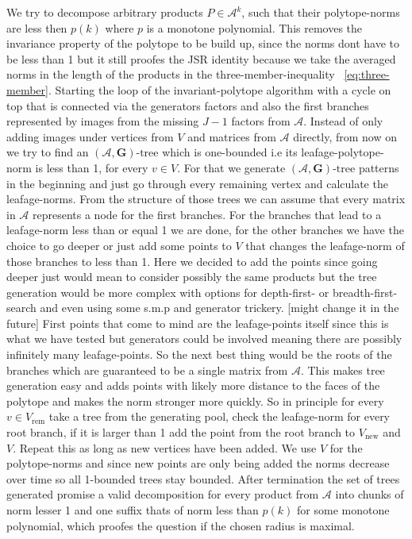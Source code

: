 We try to decompose arbitrary products $P \in \mathcal{A}^k$, such that their polytope-norms are less then $p(k)$ where $p$ is a monotone polynomial.
This removes the invariance property of the polytope to be build up, since the norms dont have to be less than 1 but it still proofes the JSR identity because we take the averaged norms in the length of the products in the three-member-inequality ~\ref{eq:three-member}.
\newline 
Starting the loop of the invariant-polytope algorithm with a cycle on top that is connected via the generators factors and also the first branches represented by images from the missing $J-1$ factors from $\mathcal{A}$. Instead of only adding images under vertices from $V$ and matrices from $\mathcal{A}$ directly, from now on we try to find an $(\mathcal{A},\mathbf{G})\text{-tree}$ which is one-bounded i.e its leafage-polytope-norm is less than 1, for every $v \in V$.
For that we generate $(\mathcal{A},\mathbf{G})\text{-tree}$ patterns in the beginning and just go through every remaining vertex and calculate the leafage-norms. From the structure of those trees we can assume that every matrix in $\mathcal{A}$ represents a node for the first branches.
For the branches that lead to a leafage-norm less than or equal 1 we are done, for the other branches we have the choice to go deeper or just add some points to $V$ that changes the leafage-norm of those branches to less than 1. Here we decided to add the points since going deeper just would mean to consider possibly the same products but the tree generation would be more complex with options for depth-first- or breadth-first-search and even using some s.m.p and generator trickery. [might change it in the future]
\newline
First points that come to mind are the leafage-points itself since this is what we have tested but generators could be involved meaning there are possibly infinitely many leafage-points. So the next best thing would be the roots of the branches which are guaranteed to be a single matrix from $\mathcal{A}$. This makes tree generation easy and adds points with likely more distance to the faces of the polytope and makes the norm stronger more quickly.
\newline
So in principle for every $v \in V_{\text{rem}}$ take a tree from the generating pool, check the leafage-norm for every root branch, if it is larger than 1 add the point from the root branch to $V_{\text{new}}$ and $V$. Repeat this as long as new vertices have been added. We use $V$ for the polytope-norms and since new points are only being added the norms decrease over time so all 1-bounded trees stay bounded.
\newline
After termination the set of trees generated promise a valid decomposition for every product from $\mathcal{A}$ into chunks of norm lesser 1 and one suffix thats of norm less than $p(k)$ for some monotone polynomial, which proofes the question if the chosen radius is maximal.

